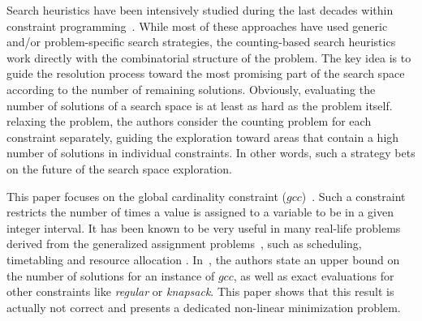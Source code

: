 Search heuristics have been intensively studied during the last decades within constraint programming~\cite{BoussemartHLS04,Refalo04,MichelH12}. While most of these approaches have used generic and/or problem-specific search strategies, the counting\--based search heuristics~\cite{PesantQZ12} work directly with the combinatorial structure of the problem. The key idea is to guide the resolution process toward the most promising part of the search space according to the number of remaining solutions. 
Obviously, evaluating the number of solutions of a search space is at least as hard as the problem itself.
 relaxing the problem, the authors consider the counting problem for each constraint separately, guiding the exploration toward areas that contain a high number of solutions in individual constraints. In other words, such a strategy bets on the future of the search space exploration.

This paper focuses on the global cardinality constraint ($gcc$)~\cite{Regin96}. 
Such a constraint restricts the number of times a value is assigned to a variable to be in a given integer interval. It has been known to be very useful in many real-life problems derived from the generalized assignment problems~\cite{Ford}, such as scheduling, timetabling and resource allocation \cite{Nuijten94}. 
In~\cite{PesantQZ12}, the authors state an upper bound on the number of solutions for an instance of $gcc$, as well as exact evaluations for other constraints like \emph{regular} or \emph{knapsack}. This paper shows that this result is actually not correct and presents  a dedicated non\--linear minimization problem.  

